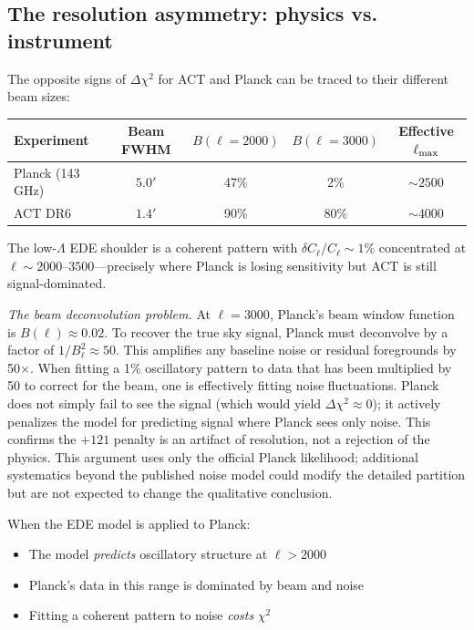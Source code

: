 \documentclass[twocolumn,showpacs,preprintnumbers,amsmath,amssymb,prd]{revtex4-2}
\begin{document}
\subsection{The resolution asymmetry: physics vs. instrument}

The opposite signs of $\Delta\chi^2$ for ACT and Planck can be traced to their 
different beam sizes:
\begin{center}
\begin{tabular}{lcccc}
\toprule
Experiment & Beam FWHM & $B(\ell=2000)$ & $B(\ell=3000)$ & Effective $\ell_{\rm max}$ \\
\midrule
Planck (143 GHz) & $5.0'$ & 47\% & 2\% & $\sim 2500$ \\
ACT DR6 & $1.4'$ & 90\% & 80\% & $\sim 4000$ \\
\bottomrule
\end{tabular}
\end{center}

The low-$\Lambda$ EDE shoulder is a coherent pattern with $\delta C_\ell / C_\ell 
\sim 1\%$ concentrated at $\ell \sim 2000$--$3500$---precisely where Planck is 
losing sensitivity but ACT is still signal-dominated.

\emph{The beam deconvolution problem.} At $\ell = 3000$, Planck's beam window 
function is $B(\ell) \approx 0.02$. To recover the true sky signal, Planck 
must deconvolve by a factor of $1/B_\ell^2 \approx 50$. This amplifies any 
baseline noise or residual foregrounds by 50$\times$. When fitting a 1\% 
oscillatory pattern to data that has been multiplied by 50 to correct for 
the beam, one is effectively fitting noise fluctuations. Planck 
does not simply fail to see the signal (which would yield $\Delta\chi^2 \approx 0$); 
it actively penalizes the model for predicting signal where Planck sees only 
noise. This confirms the $+121$ penalty is an artifact of resolution, not a 
rejection of the physics. This argument uses only the official Planck 
likelihood; additional systematics beyond the published noise model could 
modify the detailed partition but are not expected to change the qualitative 
conclusion.

When the EDE model is applied to Planck:
\begin{itemize}
\item The model \emph{predicts} oscillatory structure at $\ell > 2000$
\item Planck's data in this range is dominated by beam and noise
\item Fitting a coherent pattern to noise \emph{costs} $\chi^2$
\end{itemize}
\end{document}
